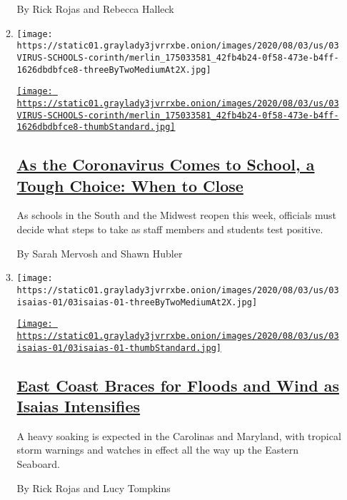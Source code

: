 \begin{enumerate}
\begin{enumerate}
    By Rick Rojas and Rebecca Halleck
  \item
    \texttt{[image: https://static01.graylady3jvrrxbe.onion/images/2020/08/03/us/03VIRUS-SCHOOLS-corinth/merlin\_175033581\_42fb4b24-0f58-473e-b4ff-1626dbdbfce8-threeByTwoMediumAt2X.jpg]}

    \href{/2020/08/03/us/school-closing-coronavirus.html}{\texttt{[image: https://static01.graylady3jvrrxbe.onion/images/2020/08/03/us/03VIRUS-SCHOOLS-corinth/merlin\_175033581\_42fb4b24-0f58-473e-b4ff-1626dbdbfce8-thumbStandard.jpg]}}

    \hypertarget{as-the-coronavirus-comes-to-school-a-tough-choice-when-to-close}{%
    \subsection{\texorpdfstring{\href{/2020/08/03/us/school-closing-coronavirus.html}{As
    the Coronavirus Comes to School, a Tough Choice: When to
    Close}}{As the Coronavirus Comes to School, a Tough Choice: When to Close}}\label{as-the-coronavirus-comes-to-school-a-tough-choice-when-to-close}}

    As schools in the South and the Midwest reopen this week, officials
    must decide what steps to take as staff members and students test
    positive.

    By Sarah Mervosh and Shawn Hubler
  \item
    \texttt{[image: https://static01.graylady3jvrrxbe.onion/images/2020/08/03/us/03isaias-01/03isaias-01-threeByTwoMediumAt2X.jpg]}

    \href{/2020/08/03/us/isaias-east-coast-landfall.html}{\texttt{[image: https://static01.graylady3jvrrxbe.onion/images/2020/08/03/us/03isaias-01/03isaias-01-thumbStandard.jpg]}}

    \hypertarget{east-coast-braces-for-floods-and-wind-as-isaias-intensifies}{%
    \subsection{\texorpdfstring{\href{/2020/08/03/us/isaias-east-coast-landfall.html}{East
    Coast Braces for Floods and Wind as Isaias
    Intensifies}}{East Coast Braces for Floods and Wind as Isaias Intensifies}}\label{east-coast-braces-for-floods-and-wind-as-isaias-intensifies}}

    A heavy soaking is expected in the Carolinas and Maryland, with
    tropical storm warnings and watches in effect all the way up the
    Eastern Seaboard.

    By Rick Rojas and Lucy Tompkins
  \end{enumerate}
\end{enumerate}

